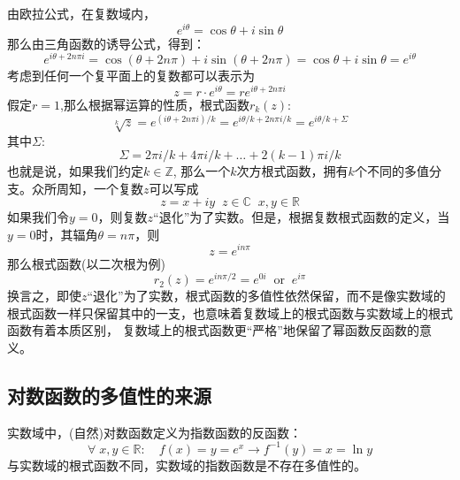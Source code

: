 \documentclass[12pt, a4paper, oneside]{ctexart}
\begin{document}
由欧拉公式，在复数域内，
$$
e^{i\theta}=\cos \theta + i \sin \theta
$$
那么由三角函数的诱导公式，得到：
$$
e^{i\theta+2n\pi i}=\cos (\theta+2n\pi) + i \sin (\theta+2n\pi)=\cos \theta + i \sin \theta=e^{i\theta}
$$
考虑到任何一个复平面上的复数都可以表示为
$$
z=r\cdot e^{i\theta}=re^{i\theta+2n\pi i}
$$
假定$r=1$,那么根据幂运算的性质，根式函数$r_k(z)$:
$$
\sqrt[k]{z}=e^{(i\theta+2n\pi i)/k}=e^{i\theta/k+2n\pi i/k} =e^{i\theta/k+\Sigma}
$$
其中$\Sigma$:
$$
\Sigma = 2 \pi i /k + 4 \pi i/k+\dots+2(k-1)\pi i/k
$$
也就是说，如果我们约定$k\in \mathbb{Z}$, 那么一个$k$次方根式函数，拥有$k$个不同的多值分支。众所周知，一个复数$z$可以写成
$$
z=x+iy\;\; z\in\mathbb{C} \;\; x,y \in \mathbb{R}
$$
如果我们令$y=0$，则复数$z$“退化”为了实数。但是，根据复数根式函数的定义，当$y=0$时，其辐角$\theta=n\pi$，则
$$
z=e^{in\pi}
$$
那么根式函数(以二次根为例)
$$
r_2(z)=e^{in\pi/2}=e^{0i}\;\; \text{or} \;\; e^{i\pi}
$$
换言之，即使$z$“退化”为了实数，根式函数的多值性依然保留，而不是像实数域的根式函数一样只保留其中的一支，也意味着复数域上的根式函数与实数域上的根式函数有着本质区别，
复数域上的根式函数更“严格”地保留了幂函数反函数的意义。

\subsection{对数函数的多值性的来源}
实数域中，(自然)对数函数定义为指数函数的反函数：
$$\forall\; x,y\in \mathbb{R}:\quad f(x)=y=e^x \to f^{-1}(y)=x=\ln y$$
与实数域的根式函数不同，实数域的指数函数是不存在多值性的。

\begin{figure}[h]
\end{figure}
\end{document}
